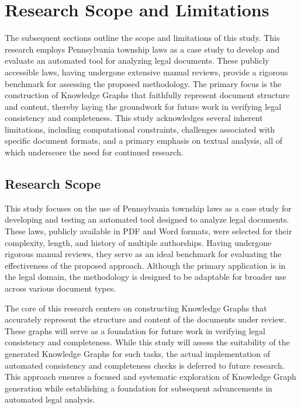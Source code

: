 \section{Research Scope and Limitations}
The subsequent sections outline the scope and limitations of this study. This research employs Pennsylvania township laws as a case study to develop and evaluate an automated tool for analyzing legal documents. These publicly accessible laws, having undergone extensive manual reviews, provide a rigorous benchmark for assessing the proposed methodology. The primary focus is the construction of Knowledge Graphs that faithfully represent document structure and content, thereby laying the groundwork for future work in verifying legal consistency and completeness. This study acknowledges several inherent limitations, including computational constraints, challenges associated with specific document formats, and a primary emphasis on textual analysis, all of which underscore the need for continued research.
\subsection{Research Scope}

This study focuses on the use of Pennsylvania township laws as a case study for developing and testing an automated tool designed to analyze legal documents. These laws, publicly available in PDF and Word formats, were selected for their complexity, length, and history of multiple authorships. Having undergone rigorous manual reviews, they serve as an ideal benchmark for evaluating the effectiveness of the proposed approach. Although the primary application is in the legal domain, the methodology is designed to be adaptable for broader use across various document types.

The core of this research centers on constructing Knowledge Graphs that accurately represent the structure and content of the documents under review. These graphs will serve as a foundation for future work in verifying legal consistency and completeness. While this study will assess the suitability of the generated Knowledge Graphs for such tasks, the actual implementation of automated consistency and completeness checks is deferred to future research. This approach ensures a focused and systematic exploration of Knowledge Graph generation while establishing a foundation for subsequent advancements in automated legal analysis.

